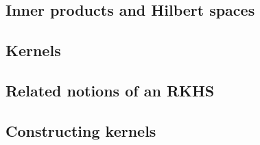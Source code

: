 

\subsection{Inner products and Hilbert spaces}
\label{sub:inner-products-and-hilbert-spaces}


\subsection{Kernels}
\label{sub:kernels}


\subsection{Related notions of an RKHS}
\label{sub:rkhs-equivalence}


\subsection{Constructing kernels}
\label{sub:constructing-kernels}

